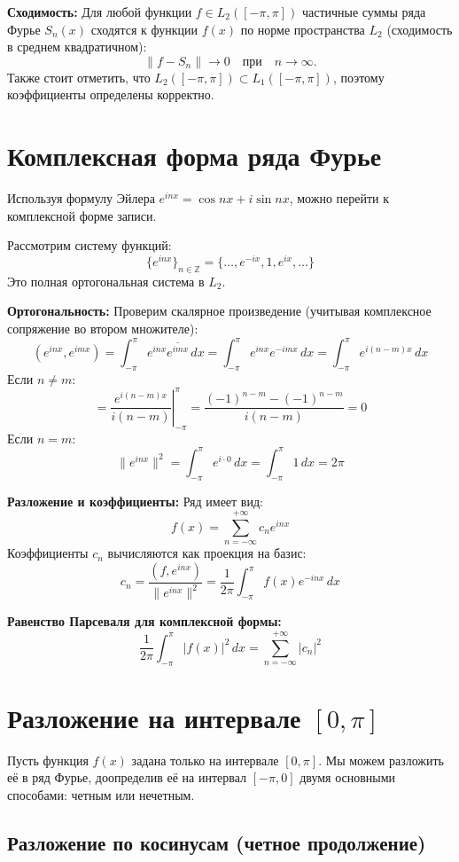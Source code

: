 \documentclass[12pt,a4paper,openany]{book}
\begin{document}
\textbf{Сходимость:}
Для любой функции $f \in L_2([-\pi, \pi])$ частичные суммы ряда Фурье $S_n(x)$ сходятся к функции $f(x)$ по норме пространства $L_2$ (сходимость в среднем квадратичном):
$$
\| f - S_n \| \to 0 \quad \text{при} \quad n \to \infty.
$$
Также стоит отметить, что $L_2([-\pi, \pi]) \subset L_1([-\pi, \pi])$, поэтому коэффициенты определены корректно.

\section{Комплексная форма ряда Фурье}

Используя формулу Эйлера $e^{inx} = \cos nx + i \sin nx$, можно перейти к комплексной форме записи.

Рассмотрим систему функций:
$$
\{ e^{inx} \}_{n \in \mathbb{Z}} = \{ \dots, e^{-ix}, 1, e^{ix}, \dots \}
$$
Это полная ортогональная система в $L_2$.

\textbf{Ортогональность:}
Проверим скалярное произведение (учитывая комплексное сопряжение во втором множителе):
$$
(e^{inx}, e^{imx}) = \int_{-\pi}^{\pi} e^{inx} \overline{e^{imx}} \, dx = \int_{-\pi}^{\pi} e^{inx} e^{-imx} \, dx = \int_{-\pi}^{\pi} e^{i(n-m)x} \, dx
$$
Если $n \neq m$:
$$
= \left. \frac{e^{i(n-m)x}}{i(n-m)} \right|_{-\pi}^{\pi} = \frac{(-1)^{n-m} - (-1)^{n-m}}{i(n-m)} = 0
$$
Если $n = m$:
$$
\|e^{inx}\|^2 = \int_{-\pi}^{\pi} e^{i \cdot 0} \, dx = \int_{-\pi}^{\pi} 1 \, dx = 2\pi
$$

\textbf{Разложение и коэффициенты:}
Ряд имеет вид:
$$
f(x) = \sum_{n=-\infty}^{+\infty} c_n e^{inx}
$$
Коэффициенты $c_n$ вычисляются как проекция на базис:
$$
c_n = \frac{(f, e^{inx})}{\|e^{inx}\|^2} = \frac{1}{2\pi} \int_{-\pi}^{\pi} f(x) e^{-inx} \, dx
$$

\textbf{Равенство Парсеваля для комплексной формы:}
$$
\frac{1}{2\pi} \int_{-\pi}^{\pi} |f(x)|^2 \, dx = \sum_{n=-\infty}^{+\infty} |c_n|^2
$$

\section{Разложение на интервале $[0, \pi]$}

Пусть функция $f(x)$ задана только на интервале $[0, \pi]$. Мы можем разложить её в ряд Фурье, доопределив её на интервал $[-\pi, 0]$ двумя основными способами: четным или нечетным.

\subsection{Разложение по косинусам (четное продолжение)}
\end{document}
